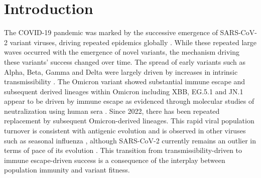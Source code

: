 \documentclass[11pt,oneside,letterpaper]{article}
\begin{document}
\begin{abstract}
\noindent During the COVID-19 pandemic, SARS-CoV-2 variants drove large waves of infections, fueled by increased transmissibility and immune escape.
Current models focus on changes in variant frequencies without linking them to underlying transmission mechanisms of intrinsic transmissibility and immune escape.
We introduce a framework connecting variant dynamics to these mechanisms, showing how host population immunity interacts with viral transmissibility and immune escape to determine relative variant fitness.
We advance a selective pressure metric that provides an early signal of epidemic growth using genetic data alone, crucial with current underreporting of cases.
Additionally, we show that a latent immunity space model approximates immunological distances, offering insights into population susceptibility and immune evasion.
These insights refine real-time forecasting and lay the groundwork for research into the interplay between viral genetics, immunity, and epidemic growth.
\end{abstract}

\section*{Introduction}


The COVID-19 pandemic was marked by the successive emergence of SARS-CoV-2 variant viruses, driving repeated epidemics globally \cite{tegally2021detection, Volz2021}.
While these repeated large waves occurred with the emergence of novel variants, the mechanism driving these variants' success changed over time.
The spread of early variants such as Alpha, Beta, Gamma and Delta were largely driven by increases in intrinsic transmissibility \cite{carabelli2023sars}.
The Omicron variant showed substantial immune escape \cite{carabelli2023sars} and subsequent derived lineages within Omicron including XBB, EG.5.1 and JN.1 appear to be driven by immune escape as evidenced through molecular studies of neutralization using human sera \cite{Cao2021, Cao2022, Bekliz2024, Jian2023}.
Since 2022, there has been repeated replacement by subsequent Omicron-derived lineages.
This rapid viral population turnover is consistent with antigenic evolution and is observed in other viruses such as seasonal influenza \cite{bedford2014integrating}, although SARS-CoV-2 currently remains an outlier in terms of pace of its evolution \cite{kistler2023atlas}.
This transition from transmissibility-driven to immune escape-driven success is a consequence of the interplay between population immunity and variant fitness.
\end{document}
